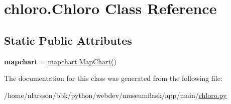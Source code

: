 \hypertarget{classchloro_1_1Chloro}{}\section{chloro.\+Chloro Class Reference}
\label{classchloro_1_1Chloro}
\subsection*{Static Public Attributes}
\begin{DoxyCompactItemize}
\item 
\mbox{\label{classchloro_1_1Chloro_a15af3a2393cc8b4e33d8ee3fa600de03}} 
{\bfseries mapchart} = \mbox{\hyperlink{classmapchart_1_1MapChart}{mapchart.\+Map\+Chart}}()
\end{DoxyCompactItemize}


The documentation for this class was generated from the following file\+:\begin{DoxyCompactItemize}
\item 
/home/nlarsson/bbk/python/webdev/museumflask/app/main/\mbox{\hyperlink{chloro_8py}{chloro.\+py}}\end{DoxyCompactItemize}
